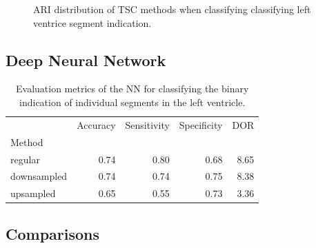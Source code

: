 \begin{figure}[htb]
    \centering
    
    \caption{ARI distribution of TSC methods when classifying classifying left ventrice segment indication.}
    \label{fig:tsc_segm_ind_ari}
\end{figure}

\newpage

\subsection{Deep Neural Network}

\begin{table}[htb]
    \centering
    \begin{tabular}{lrrrr}
        \toprule
        {}          &  Accuracy &  Sensitivity &  Specificity &  DOR \\
        Method      &           &              &              &      \\
        \midrule
        regular     &      0.74 &         0.80 &         0.68 & 8.65 \\
        downsampled &      0.74 &         0.74 &         0.75 & 8.38 \\
        upsampled   &      0.65 &         0.55 &         0.73 & 3.36 \\
        \bottomrule
    \end{tabular}
    \caption{Evaluation metrics of the NN for classifying the binary indication of individual segments in the left ventricle.}
    \label{tab:NN_segm_ind_perf}
\end{table}

\subsection{Comparisons}

